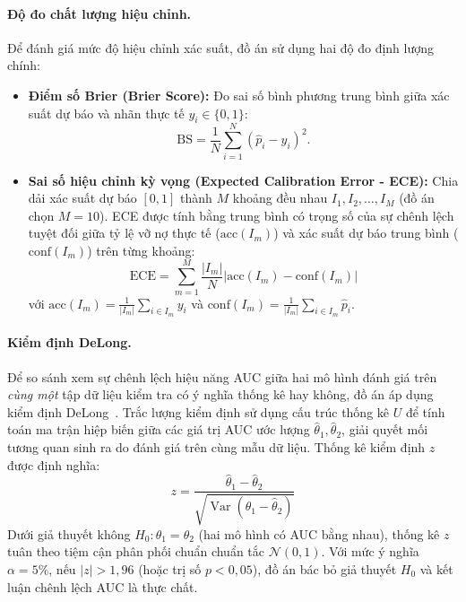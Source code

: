 \documentclass[12pt,a4paper,oneside]{report}
\theoremstyle{vnplain}
\theoremstyle{vndef}
\begin{document}
\paragraph{Độ đo chất lượng hiệu chỉnh.} Để đánh giá mức độ hiệu chỉnh xác suất, đồ án sử dụng hai độ đo định lượng chính:
\begin{itemize}
  \item \textbf{Điểm số Brier (Brier Score):} Đo sai số bình phương trung bình giữa xác suất dự báo và nhãn thực tế $y_i \in \{0, 1\}$:
        \begin{equation}
          \mathrm{BS} = \frac{1}{N}\sum_{i=1}^{N} (\hat{p}_i - y_i)^2.
          \label{eq:brier}
        \end{equation}
  \item \textbf{Sai số hiệu chỉnh kỳ vọng (Expected Calibration Error - ECE):} Chia dải xác suất dự báo $[0, 1]$ thành $M$ khoảng đều nhau $I_1, I_2, \dots, I_M$ (đồ án chọn $M=10$). ECE được tính bằng trung bình có trọng số của sự chênh lệch tuyệt đối giữa tỷ lệ vỡ nợ thực tế ($\mathrm{acc}(I_m)$) và xác suất dự báo trung bình ($\mathrm{conf}(I_m)$) trên từng khoảng:
        \begin{equation}
          \mathrm{ECE} = \sum_{m=1}^{M} \frac{|I_m|}{N} \Big| \mathrm{acc}(I_m) - \mathrm{conf}(I_m) \Big|
          \label{eq:ece}
        \end{equation}
        với $\mathrm{acc}(I_m) = \frac{1}{|I_m|}\sum_{i \in I_m} y_i$ và $\mathrm{conf}(I_m) = \frac{1}{|I_m|}\sum_{i \in I_m} \hat{p}_i$.
\end{itemize}

\paragraph{Kiểm định DeLong.} Để so sánh xem sự chênh lệch hiệu năng AUC giữa hai mô hình đánh giá trên \emph{cùng một} tập dữ liệu kiểm tra có ý nghĩa thống kê hay không, đồ án áp dụng kiểm định DeLong~\cite{delong1988}. Trắc lượng kiểm định sử dụng cấu trúc thống kê $U$ để tính toán ma trận hiệp biến giữa các giá trị AUC ước lượng $\hat{\theta}_1, \hat{\theta}_2$, giải quyết mối tương quan sinh ra do đánh giá trên cùng mẫu dữ liệu. Thống kê kiểm định $z$ được định nghĩa:
\begin{equation}
  z = \frac{\hat{\theta}_1 - \hat{\theta}_2}{\sqrt{\operatorname{Var}(\hat{\theta}_1 - \hat{\theta}_2)}}
  \label{eq:delong}
\end{equation}
Dưới giả thuyết không $H_0: \theta_1 = \theta_2$ (hai mô hình có AUC bằng nhau), thống kê $z$ tuân theo tiệm cận phân phối chuẩn chuẩn tắc $\mathcal{N}(0, 1)$. Với mức ý nghĩa $\alpha = 5\%$, nếu $|z| > 1{,}96$ (hoặc trị số $p < 0{,}05$), đồ án bác bỏ giả thuyết $H_0$ và kết luận chênh lệch AUC là thực chất.
\end{document}
